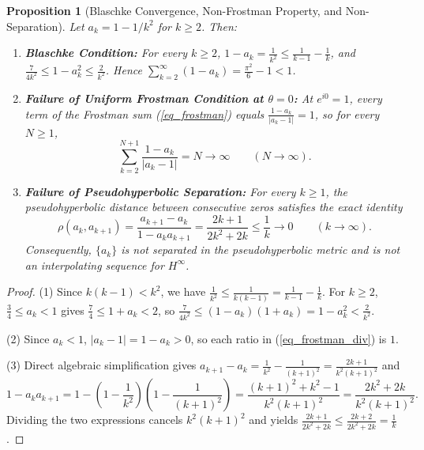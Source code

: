 \documentclass[11pt,reqno]{amsart}
\newtheorem{prop}[thm]{Proposition}
\numberwithin{equation}{section}
\begin{document}
\begin{prop}[Blaschke Convergence, Non-Frostman Property, and Non-Separation] \label{prop_borderline}
Let $a_k = 1 - 1/k^2$ for $k \ge 2$. Then:
\begin{enumerate}
\item \textbf{Blaschke Condition:} For every $k \ge 2$, $1 - a_k = \frac{1}{k^2} \le \frac{1}{k-1} - \frac{1}{k}$, and $\frac{7}{4k^2} \le 1 - a_k^2 \le \frac{2}{k^2}$. Hence $\sum_{k=2}^\infty (1 - a_k) = \frac{\pi^2}{6} - 1 < 1$.
\item \textbf{Failure of Uniform Frostman Condition at $\theta = 0$:} At $e^{i0} = 1$, every term of the Frostman sum (\ref{eq_frostman}) equals $\frac{1 - a_k}{|a_k - 1|} = 1$, so for every $N \ge 1$,
\begin{equation} \label{eq_frostman_div}
  \sum_{k=2}^{N+1} \frac{1 - a_k}{|a_k - 1|} = N \longrightarrow \infty \qquad (N \to \infty).
\end{equation}
\item \textbf{Failure of Pseudohyperbolic Separation:} For every $k \ge 1$, the pseudohyperbolic distance between consecutive zeros satisfies the exact identity
\begin{equation} \label{eq_rho_exact}
  \rho(a_k, a_{k+1}) = \frac{a_{k+1} - a_k}{1 - a_k a_{k+1}} = \frac{2k + 1}{2k^2 + 2k} \le \frac{1}{k} \longrightarrow 0 \qquad (k \to \infty).
\end{equation}
Consequently, $\{a_k\}$ is not separated in the pseudohyperbolic metric and is not an interpolating sequence for $H^\infty$.
\end{enumerate}
\end{prop}
\begin{proof}
(1) Since $k(k-1) < k^2$, we have $\frac{1}{k^2} \le \frac{1}{k(k-1)} = \frac{1}{k-1} - \frac{1}{k}$. For $k \ge 2$, $\frac{3}{4} \le a_k < 1$ gives $\frac{7}{4} \le 1 + a_k < 2$, so $\frac{7}{4k^2} \le (1 - a_k)(1 + a_k) = 1 - a_k^2 < \frac{2}{k^2}$.

(2) Since $a_k < 1$, $|a_k - 1| = 1 - a_k > 0$, so each ratio in (\ref{eq_frostman_div}) is $1$.

(3) Direct algebraic simplification gives $a_{k+1} - a_k = \frac{1}{k^2} - \frac{1}{(k+1)^2} = \frac{2k + 1}{k^2(k+1)^2}$ and
\[
  1 - a_k a_{k+1} = 1 - \left(1 - \frac{1}{k^2}\right)\!\left(1 - \frac{1}{(k+1)^2}\right) = \frac{(k+1)^2 + k^2 - 1}{k^2(k+1)^2} = \frac{2k^2 + 2k}{k^2(k+1)^2}.
\]
Dividing the two expressions cancels $k^2(k+1)^2$ and yields $\frac{2k+1}{2k^2+2k} \le \frac{2k+2}{2k^2+2k} = \frac{1}{k}$.
\end{proof}
\end{document}
